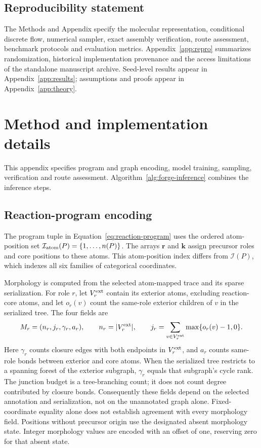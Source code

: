 \documentclass{article}
\theoremstyle{definition}
\begin{document}
\subsection*{Reproducibility statement}
The Methods and Appendix specify the molecular representation, conditional discrete flow, numerical
sampler, exact assembly verification, route assessment, benchmark protocols and evaluation metrics.
Appendix~\ref{app:repro} summarizes randomization, historical implementation provenance and the
access limitations of the standalone manuscript archive. Seed-level results appear in
Appendix~\ref{app:results}; assumptions and proofs appear in Appendix~\ref{app:theory}.




\clearpage
\appendix

\section{Method and implementation details}
\label{app:forge}

This appendix specifies program and graph encoding, model training, sampling, verification and
route assessment. Algorithm~\ref{alg:forge-inference} combines the inference steps.

\subsection{Reaction-program encoding}
\label{app:program-encoding}

The program tuple in Equation~\ref{eq:reaction-program} uses the ordered atom-position set
$\mathcal I_{\rm atom}(P)=\{1,\ldots,n(P)\}$. The arrays $\mathbf r$ and $\mathbf k$ assign
precursor roles and core positions to these atoms. This atom-position index differs from
$\mathcal I(P)$, which indexes all six families of categorical coordinates.

Morphology is computed from the selected atom-mapped trace and its sparse serialization.
For role $r$, let $V_r^{\rm ext}$ contain its exterior atoms, excluding reaction-core atoms, and
let $o_r(v)$ count the same-role exterior children of $v$ in the serialized tree. The four fields are
\begin{equation}
 M_r=(n_r,j_r,\gamma_r,a_r),\qquad
 n_r=|V_r^{\rm ext}|,\qquad
 j_r=\sum_{v\in V_r^{\rm ext}}\max\{o_r(v)-1,0\}.
\end{equation}
Here $\gamma_r$ counts closure edges with both endpoints in $V_r^{\rm ext}$, and $a_r$ counts
same-role bonds between exterior and core atoms. When the serialized tree restricts to a spanning
forest of the exterior subgraph, $\gamma_r$ equals that subgraph's cycle rank. The junction budget
is a tree-branching count; it does not count degree contributed by closure bonds. Consequently these
fields depend on the selected annotation and serialization, not on the unannotated graph alone.
Fixed-coordinate equality alone does not establish agreement with every morphology field.
Positions without precursor origin use the designated absent morphology state. Integer morphology
values are encoded with an offset of one, reserving zero for that absent state.
\end{document}
